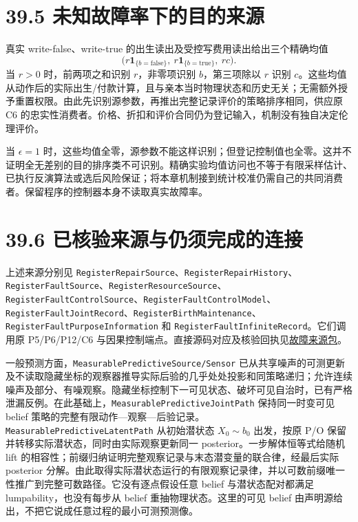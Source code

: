 \documentclass[
  11pt,
  oneside]{book}
\begin{document}
\section{39.5 未知故障率下的目的来源}\label{ux672aux77e5ux6545ux969cux7387ux4e0bux7684ux76eeux7684ux6765ux6e90}

真实 write-false、write-true 的出生读出及受控写费用读出给出三个精确均值 \[\bigl(r\mathbf1_{\{b=\mathrm{false}\}},\ r\mathbf1_{\{b=\mathrm{true}\}},\ rc\bigr).\] 当 \(r>0\) 时，前两项之和识别 \(r\)，非零项识别 \(b\)，第三项除以 \(r\) 识别 \(c\)。这些均值从动作后的实际出生/付款计算，且与亲本当时物理状态和历史无关；无需额外授予重置权限。由此先识别源参数，再推出完整记录评价的策略排序相同，供应原 C6 的忠实性消费者。价格、折扣和评价合同仍为登记输入，机制没有独自决定伦理评价。

当 \(\epsilon=1\) 时，这些均值全零，源参数不能这样识别；但登记控制值也全零。这并不证明全无差别的目的排序类不可识别。精确实验均值访问也不等于有限采样估计、已执行反演算法或选后风险保证；将本章机制接到统计校准仍需自己的共同消费者。保留程序的控制器本身不读取真实故障率。

\section{39.6 已核验来源与仍须完成的连接}\label{ux5df2ux6838ux9a8cux6765ux6e90ux4e0eux4ecdux987bux5b8cux6210ux7684ux8fdeux63a5}

上述来源分别见 \nolinkurl{RegisterRepairSource}、\nolinkurl{RegisterRepairHistory}、\nolinkurl{RegisterFaultSource}、\nolinkurl{RegisterResourceSource}、\nolinkurl{RegisterFaultControlSource}、\nolinkurl{RegisterFaultControlModel}、\nolinkurl{RegisterFaultJointRecord}、\nolinkurl{RegisterBirthMaintenance}、\nolinkurl{RegisterFaultPurposeInformation} 和 \nolinkurl{RegisterFaultInfiniteRecord}。它们调用原 P5/P6/P12/C6 与因果控制端点。直接源码对应及核验回执见\href{../formalization/ueot-core/docs/compression/theory_completion/unified_closure/register_fault_resources_v1/RESULTS_AND_OPEN_OBLIGATIONS.md}{故障来源包}。

一般预测方面，\nolinkurl{MeasurablePredictiveSource/Sensor} 已从共享噪声的可测更新及不读取隐藏坐标的观察器推导实际后验的几乎处处投影和同策略递归；允许连续噪声及部分、有噪观察。隐藏坐标控制下一可见状态、破坏可见自治时，已有严格泄漏反例。在此基础上，\nolinkurl{MeasurablePredictiveJointPath} 保持同一时变可见 belief 策略的完整有限动作---观察---后验记录。\nolinkurl{MeasurablePredictiveLatentPath} 从初始潜状态 \(X_0\sim b_0\) 出发，按原 P/O 保留并转移实际潜状态，同时由实际观察更新同一 posterior。一步解体恒等式给随机 lift 的相容性；前缀归纳证明完整观察记录与末态潜变量的联合律，经最后实际 posterior 分解。由此取得实际潜状态运行的有限观察记录律，并以可数前缀唯一性推广到完整可数路径。它没有逐点假设任意 belief 与潜状态配对都满足 lumpability，也没有每步从 belief 重抽物理状态。这里的可见 belief 由声明源给出，不把它说成任意过程的最小可测预测像。
\end{document}
